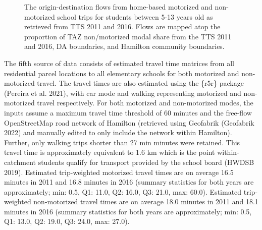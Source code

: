 \documentclass[
default
]{sn-jnl}
\begin{document}
\begin{figure}[H]


\caption{\label{fig-Fig3}The origin-destination flows from home-based
motorized and non-motorized school trips for students between 5-13 years
old as retrieved from TTS 2011 and 2016. Flows are mapped atop the
proportion of TAZ non/motorized modal share from the TTS 2011 and 2016,
DA boundaries, and Hamilton community boundaries.}

\end{figure}%

The fifth source of data consists of estimated travel time matrices from
all residential parcel locations to all elementary schools for both
motorized and non-motorized travel. The travel times are also estimated
using the \{r5r\} package (Pereira et al. 2021), with car mode and
walking representing motorized and non-motorized travel respectively.
For both motorized and non-motorized modes, the inputs assume a maximum
travel time threshold of 60 minutes and the free-flow OpenStreetMap road
network of Hamilton (retrieved using Geofabrik (Geofabrik 2022) and
manually edited to only include the network within Hamilton). Further,
only walking trips shorter than 27 min minutes were retained. This
travel time is approximately equivalent to 1.6 km which is the point
within-catchment students qualify for transport provided by the school
board (HWDSB 2019). Estimated trip-weighted motorized travel times are
on average 16.5 minutes in 2011 and 16.8 minutes in 2016 (summary
statistics for both years are approximately; min: 0.5, Q1: 11.0, Q2:
16.0, Q3: 21.0, max: 60.0). Estimated trip-weighted non-motorized travel
times are on average 18.0 minutes in 2011 and 18.1 minutes in 2016
(summary statistics for both years are approximately; min: 0.5, Q1:
13.0, Q2: 19.0, Q3: 24.0, max: 27.0).
\end{document}
